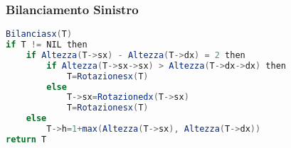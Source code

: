 \subsubsection{Bilanciamento Sinistro}
\begin{lstlisting}[language=Java]
Bilanciasx(T)
if T != NIL then
    if Altezza(T->sx) - Altezza(T->dx) = 2 then
        if Altezza(T->sx->sx) > Altezza(T->dx->dx) then
            T=Rotazionesx(T)
        else 
            T->sx=Rotazionedx(T->sx)
            T=Rotazionesx(T)
    else 
        T->h=1+max(Altezza(T->sx), Altezza(T->dx))
return T
\end{lstlisting}

